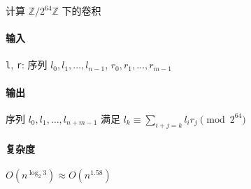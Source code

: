 计算 \(\mathbb{Z}/2^{64}\mathbb{Z}\) 下的卷积

\paragraph{输入}

\verb|l|, \verb|r|: 序列 \(l_0, l_1, \dots, l_{n-1}\), \(r_0, r_1, \dots, r_{m-1}\)

\paragraph{输出}

序列 \(l_0, l_1, \dots, l_{n+m-1}\) 满足 \(l_k\equiv \sum_{i+j=k}l_ir_j\pmod{2^{64}}\)

\paragraph{复杂度}

\(O\left(n^{\log_2 3}\right)\approx O\left(n^{1.58}\right)\)
